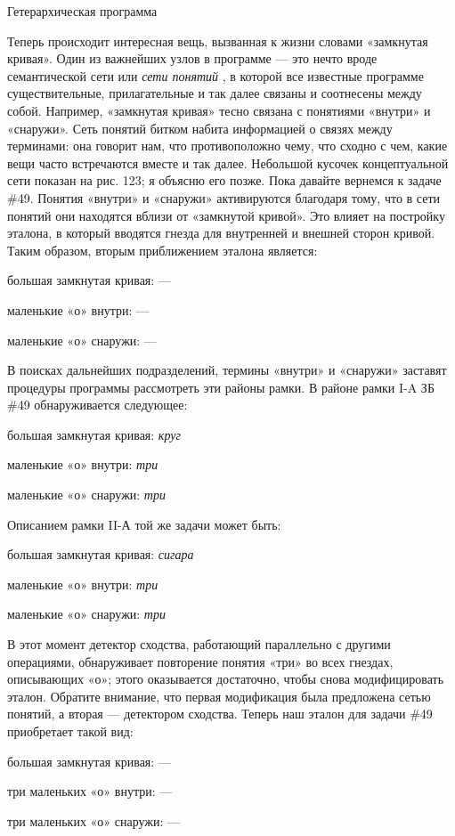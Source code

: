 \documentclass[../main.tex]{subfiles}
\begin{document}
Гетерархическая программа

Теперь происходит интересная вещь, вызванная к жизни словами «замкнутая кривая». Один из важнейших узлов в программе --- это нечто вроде семантической сети или \emph{сети понятий} , в которой все известные программе существительные, прилагательные и так далее связаны и соотнесены между собой. Например, «замкнутая кривая» тесно связана с понятиями «внутри» и «снаружи». Сеть понятий битком набита информацией о связях между терминами: она говорит нам, что противоположно чему, что сходно с чем, какие вещи часто встречаются вместе и так далее. Небольшой кусочек концептуальной сети показан на рис. 123; я объясню его позже. Пока давайте вернемся к задаче \#49. Понятия «внутри» и «снаружи» активируются благодаря тому, что в сети понятий они находятся вблизи от «замкнутой кривой». Это влияет на постройку эталона, в который вводятся гнезда для внутренней и внешней сторон кривой. Таким образом, вторым приближением эталона является:

большая замкнутая кривая: ---

маленькие «о» внутри: ---

маленькие «о» снаружи: ---

В поисках дальнейших подразделений, термины «внутри» и «снаружи» заставят процедуры программы рассмотреть эти районы рамки. В районе рамки I-A ЗБ \#49 обнаруживается следующее:

большая замкнутая кривая: \emph{круг}

маленькие «о» внутри: \emph{три}

маленькие «о» снаружи: \emph{три}

Описанием рамки II-А той же задачи может быть:

большая замкнутая кривая: \emph{сигара}

маленькие «о» внутри: \emph{три}

маленькие «о» снаружи: \emph{три}

В этот момент детектор сходства, работающий параллельно с другими операциями, обнаруживает повторение понятия «три» во всех гнездах, описывающих «о»; этого оказывается достаточно, чтобы снова модифицировать эталон. Обратите внимание, что первая модификация была предложена сетью понятий, а вторая --- детектором сходства. Теперь наш эталон для задачи \#49 приобретает такой вид:

большая замкнутая кривая: ---

три маленьких «о» внутри: ---

три маленьких «о» снаружи: ---
\end{document}
